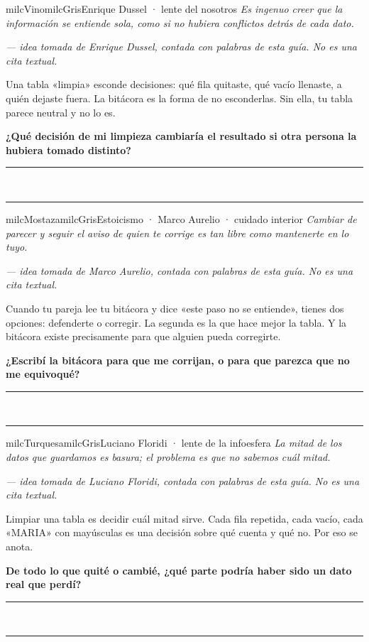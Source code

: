 \documentclass[11pt,letterpaper]{article}
\newcommand{\linead}[1]{\noindent\color{milcLinea}\rule{#1}{0.5pt}\color{milcNegro}}
\begin{document}
\begin{softbox}{milcVino}{milcGris}{Enrique Dussel · lente del nosotros}
\textit{Es ingenuo creer que la información se entiende sola, como si no hubiera conflictos detrás de cada dato.}

{\footnotesize\itshape\color{milcNegro!70}--- idea tomada de Enrique Dussel, contada con palabras de esta guía. No es una cita textual.}

Una tabla «limpia» esconde decisiones: qué fila quitaste, qué vacío llenaste, a quién dejaste fuera. La bitácora es la forma de no esconderlas. Sin ella, tu tabla parece neutral y no lo es.

\textbf{¿Qué decisión de mi limpieza cambiaría el resultado si otra persona la hubiera tomado distinto?}
\end{softbox}
\linead{\linewidth}\\[1mm]
\linead{\linewidth}

\begin{softbox}{milcMostaza}{milcGris}{Estoicismo · Marco Aurelio · cuidado interior}
\textit{Cambiar de parecer y seguir el aviso de quien te corrige es tan libre como mantenerte en lo tuyo.}

{\footnotesize\itshape\color{milcNegro!70}--- idea tomada de Marco Aurelio, contada con palabras de esta guía. No es una cita textual.}

Cuando tu pareja lee tu bitácora y dice «este paso no se entiende», tienes dos opciones: defenderte o corregir. La segunda es la que hace mejor la tabla. Y la bitácora existe precisamente para que alguien pueda corregirte.

\textbf{¿Escribí la bitácora para que me corrijan, o para que parezca que no me equivoqué?}
\end{softbox}
\linead{\linewidth}\\[1mm]
\linead{\linewidth}

\begin{softbox}{milcTurquesa}{milcGris}{Luciano Floridi · lente de la infoesfera}
\textit{La mitad de los datos que guardamos es basura; el problema es que no sabemos cuál mitad.}

{\footnotesize\itshape\color{milcNegro!70}--- idea tomada de Luciano Floridi, contada con palabras de esta guía. No es una cita textual.}

Limpiar una tabla es decidir cuál mitad sirve. Cada fila repetida, cada vacío, cada «MARIA» con mayúsculas es una decisión sobre qué cuenta y qué no. Por eso se anota.

\textbf{De todo lo que quité o cambié, ¿qué parte podría haber sido un dato real que perdí?}
\end{softbox}
\linead{\linewidth}\\[1mm]
\linead{\linewidth}
\end{document}
